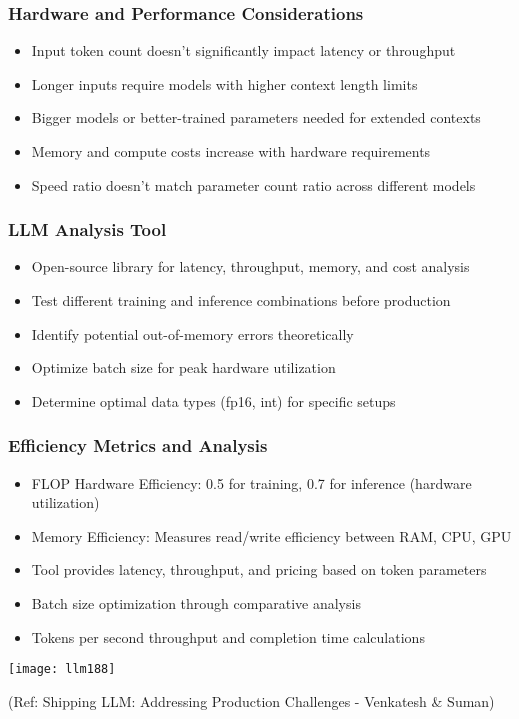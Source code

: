 \begin{frame}[fragile]\frametitle{Hardware and Performance Considerations}
      \begin{itemize}
	\item Input token count doesn't significantly impact latency or throughput
	\item Longer inputs require models with higher context length limits
	\item Bigger models or better-trained parameters needed for extended contexts
	\item Memory and compute costs increase with hardware requirements
	\item Speed ratio doesn't match parameter count ratio across different models
	  \end{itemize}
\end{frame}

\begin{frame}[fragile]\frametitle{LLM Analysis Tool}
      \begin{itemize}
	\item Open-source library for latency, throughput, memory, and cost analysis
	\item Test different training and inference combinations before production
	\item Identify potential out-of-memory errors theoretically
	\item Optimize batch size for peak hardware utilization
	\item Determine optimal data types (fp16, int) for specific setups
	  \end{itemize}
\end{frame}

\begin{frame}[fragile]\frametitle{Efficiency Metrics and Analysis}
      \begin{itemize}
	\item FLOP Hardware Efficiency: 0.5 for training, 0.7 for inference (hardware utilization)
	\item Memory Efficiency: Measures read/write efficiency between RAM, CPU, GPU
	\item Tool provides latency, throughput, and pricing based on token parameters
	\item Batch size optimization through comparative analysis
	\item Tokens per second throughput and completion time calculations
	  \end{itemize}

	\begin{center}
	\texttt{[image: llm188]}
	
	
	{\tiny (Ref: Shipping LLM: Addressing Production Challenges - Venkatesh \& Suman)}
	\end{center} 	  
\end{frame}

